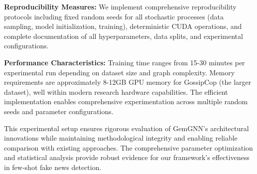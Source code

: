 \textbf{Reproducibility Measures:} We implement comprehensive reproducibility protocols including fixed random seeds for all stochastic processes (data sampling, model initialization, training), deterministic CUDA operations, and complete documentation of all hyperparameters, data splits, and experimental configurations.

\textbf{Performance Characteristics:} Training time ranges from 15-30 minutes per experimental run depending on dataset size and graph complexity. Memory requirements are approximately 8-12GB GPU memory for GossipCop (the larger dataset), well within modern research hardware capabilities. The efficient implementation enables comprehensive experimentation across multiple random seeds and parameter configurations.

This experimental setup ensures rigorous evaluation of GemGNN's architectural innovations while maintaining methodological integrity and enabling reliable comparison with existing approaches. The comprehensive parameter optimization and statistical analysis provide robust evidence for our framework's effectiveness in few-shot fake news detection.

\EndChapter
